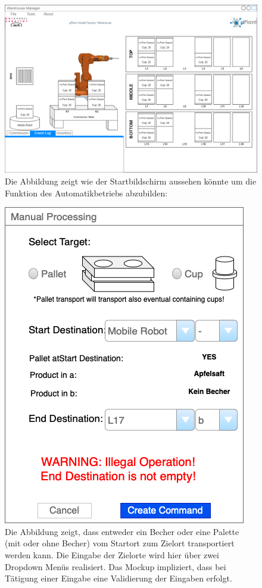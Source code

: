 \begin{figure}
        \caption[Mockup des Startbildschirms]
        {\small Die Abbildung zeigt wie der Startbildschirm aussehen könnte um die Funktion des Automatikbetriebs abzubilden:
        }\label{fig:figure11}
        \includegraphics[width = \textwidth ]{Bilder/Mockup_Startbildschirm}
        \centering
\end{figure}

\begin{figure}
        \caption[Mockup des Menüs für die manuelle Lagersteuerung]
        {\small Die Abbildung zeigt, dass entweder ein Becher oder eine Palette (mit oder ohne Becher) vom Startort zum
        Zielort transportiert werden kann. Die Eingabe der Zielorte wird hier über zwei Dropdown Menüs realisiert.
        Das Mockup impliziert, dass bei Tätigung einer Eingabe eine Validierung der Eingaben erfolgt.
        }\label{fig:figure12}
        \includegraphics[height = 0.5\textwidth ]{Bilder/Mockup_ManualProcessing}
        \centering
\end{figure}

